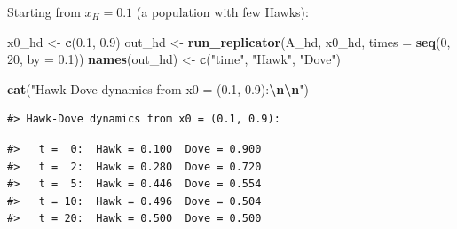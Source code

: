\documentclass[
]{article}
\newenvironment{Shaded}{\begin{snugshade}}{\end{snugshade}}
\newcommand{\AttributeTok}[1]{\textcolor[rgb]{0.13,0.29,0.53}{#1}}
\newcommand{\ControlFlowTok}[1]{\textcolor[rgb]{0.13,0.29,0.53}{\textbf{#1}}}
\newcommand{\DecValTok}[1]{\textcolor[rgb]{0.00,0.00,0.81}{#1}}
\newcommand{\FloatTok}[1]{\textcolor[rgb]{0.00,0.00,0.81}{#1}}
\newcommand{\FunctionTok}[1]{\textcolor[rgb]{0.13,0.29,0.53}{\textbf{#1}}}
\newcommand{\NormalTok}[1]{#1}
\newcommand{\OtherTok}[1]{\textcolor[rgb]{0.56,0.35,0.01}{#1}}
\newcommand{\SpecialCharTok}[1]{\textcolor[rgb]{0.81,0.36,0.00}{\textbf{#1}}}
\newcommand{\StringTok}[1]{\textcolor[rgb]{0.31,0.60,0.02}{#1}}
\begin{document}
Starting from \(x_H = 0.1\) (a population with few Hawks):

\begin{Shaded}
\begin{Highlighting}[]
\NormalTok{x0\_hd }\OtherTok{\textless{}{-}} \FunctionTok{c}\NormalTok{(}\FloatTok{0.1}\NormalTok{, }\FloatTok{0.9}\NormalTok{)}
\NormalTok{out\_hd }\OtherTok{\textless{}{-}} \FunctionTok{run\_replicator}\NormalTok{(A\_hd, x0\_hd, }\AttributeTok{times =} \FunctionTok{seq}\NormalTok{(}\DecValTok{0}\NormalTok{, }\DecValTok{20}\NormalTok{, }\AttributeTok{by =} \FloatTok{0.1}\NormalTok{))}
\FunctionTok{names}\NormalTok{(out\_hd) }\OtherTok{\textless{}{-}} \FunctionTok{c}\NormalTok{(}\StringTok{"time"}\NormalTok{, }\StringTok{"Hawk"}\NormalTok{, }\StringTok{"Dove"}\NormalTok{)}

\FunctionTok{cat}\NormalTok{(}\StringTok{"Hawk{-}Dove dynamics from x0 = (0.1, 0.9):}\SpecialCharTok{\textbackslash{}n\textbackslash{}n}\StringTok{"}\NormalTok{)}
\end{Highlighting}
\end{Shaded}

\begin{verbatim}
#> Hawk-Dove dynamics from x0 = (0.1, 0.9):
\end{verbatim}

\begin{Shaded}
\end{Shaded}

\begin{verbatim}
#>   t =  0:  Hawk = 0.100  Dove = 0.900
#>   t =  2:  Hawk = 0.280  Dove = 0.720
#>   t =  5:  Hawk = 0.446  Dove = 0.554
#>   t = 10:  Hawk = 0.496  Dove = 0.504
#>   t = 20:  Hawk = 0.500  Dove = 0.500
\end{verbatim}
\end{document}
